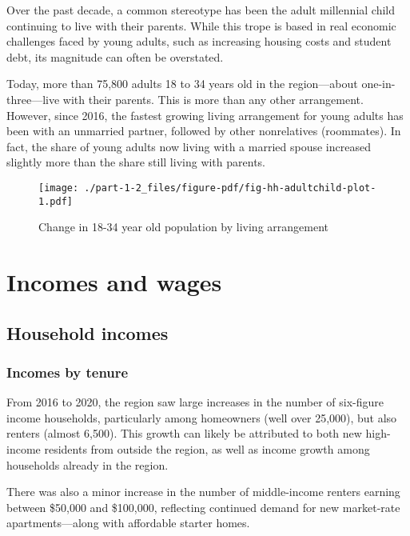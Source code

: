 \documentclass[
  letterpaper,
  DIV=11,
  numbers=noendperiod]{scrreprt}
\begin{document}
Over the past decade, a common stereotype has been the adult millennial
child continuing to live with their parents. While this trope is based
in real economic challenges faced by young adults, such as increasing
housing costs and student debt, its magnitude can often be overstated.

Today, more than 75,800 adults 18 to 34 years old in the region---about
one-in-three---live with their parents. This is more than any other
arrangement. However, since 2016, the fastest growing living arrangement
for young adults has been with an unmarried partner, followed by other
nonrelatives (roommates). In fact, the share of young adults now living
with a married spouse increased slightly more than the share still
living with parents.

\begin{figure}

{\centering \texttt{[image: ./part-1-2\_files/figure-pdf/fig-hh-adultchild-plot-1.pdf]}

}

\caption{\label{fig-hh-adultchild-plot}Change in 18-34 year old
population by living arrangement}

\end{figure}

\hypertarget{part-1-3}{%
\chapter{Incomes and wages}\label{part-1-3}}

\hypertarget{household-incomes}{%
\section{Household incomes}\label{household-incomes}}

\hypertarget{incomes-by-tenure}{%
\subsection{Incomes by tenure}\label{incomes-by-tenure}}

From 2016 to 2020, the region saw large increases in the number of
six-figure income households, particularly among homeowners (well over
25,000), but also renters (almost 6,500). This growth can likely be
attributed to both new high-income residents from outside the region, as
well as income growth among households already in the region.

There was also a minor increase in the number of middle-income renters
earning between \$50,000 and \$100,000, reflecting continued demand for
new market-rate apartments---along with affordable starter homes.
\end{document}
